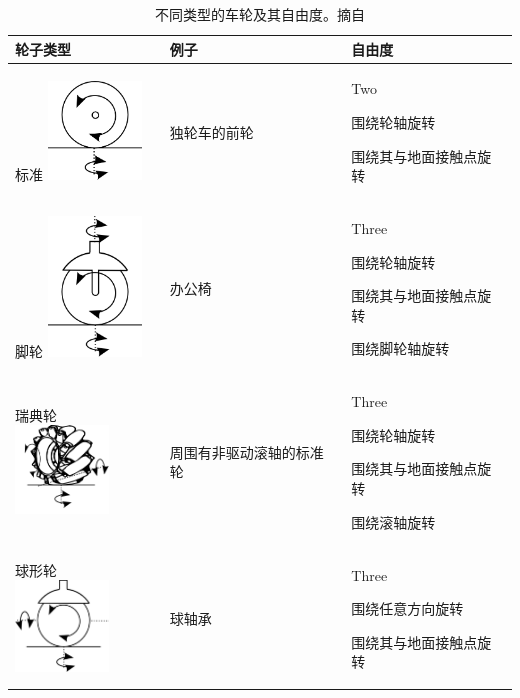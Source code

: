 \begin{table}
\begin{tabular}{p{2.8cm}p{3cm}p{4cm}}
\hline
轮子类型 & 例子 & 自由度\\
\hline
标准 \includegraphics[width=2.5cm]{figs/wheeltype_standard.png} & 独轮车的前轮	 & Two
\begin{compactitem}
\item 围绕轮轴旋转
\item 围绕其与地面接触点旋转
\end{compactitem}\\
\hline
脚轮	\includegraphics[width=2.5cm]{figs/wheeltype_caster.png}& 办公椅 & Three
\begin{compactitem}
\item 围绕轮轴旋转
\item 围绕其与地面接触点旋转
\item 围绕脚轮轴旋转
\end{compactitem}\\
\hline
瑞典轮 \includegraphics[width=2.5cm]{figs/wheeltype_swedish.png}& 周围有非驱动滚轴的标准轮 & Three
\begin{compactitem}
\item 围绕轮轴旋转
\item 围绕其与地面接触点旋转
\item 围绕滚轴旋转
\end{compactitem}\\
\hline
球形轮 \includegraphics[width=2.5cm]{figs/wheeltype_spherical.png}& 球轴承 & Three
\begin{compactitem}
\item 围绕任意方向旋转
\item 围绕其与地面接触点旋转
\end{compactitem}\\
\hline
\end{tabular}
\caption{不同类型的车轮及其自由度。摘自\protect{}
\label{tab:wheels}}
\end{table}


